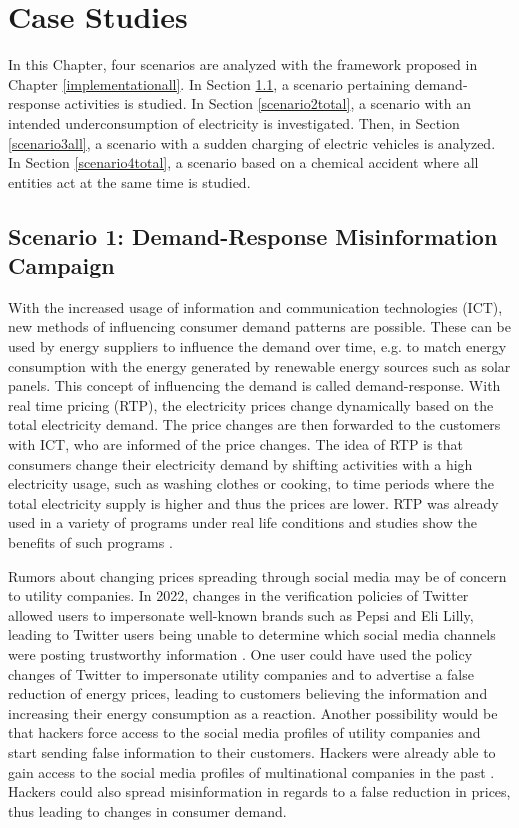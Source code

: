 \chapter{Case Studies}
\label{results}

In this Chapter, four scenarios are analyzed with the framework 
proposed in Chapter \ref{implementationall}.
In Section \ref{demandresponsesection}, a scenario
pertaining demand-response activities is studied.
In Section \ref{scenario2total}, a scenario
with an intended underconsumption of electricity is 
investigated. Then, in Section \ref{scenario3all},
a scenario with a sudden charging of electric vehicles
is analyzed.
In Section \ref{scenario4total}, a scenario 
based on a chemical accident where all entities act at 
the same time is studied.


\section{Scenario 1: Demand-Response Misinformation Campaign}
\label{demandresponsesection}

With the increased usage of information and communication 
technologies (ICT), new methods of influencing
consumer demand patterns are possible. 
These can be used by energy suppliers to influence the 
demand over time, e.g. to match energy consumption
with the energy generated by renewable energy sources such 
as solar panels. 
This concept of influencing the demand is called demand-response. 
With real time pricing (RTP), the electricity prices change
dynamically based on the total electricity demand.
The price changes are then forwarded to the customers with ICT, 
who are informed of the price changes.
The idea of RTP is that consumers change their electricity demand
by shifting activities with a high electricity usage, 
such as washing clothes or cooking, to time periods 
where the total electricity supply is higher and thus the prices
are lower.
RTP was already used in a variety of programs
under real life conditions \cite{barbose2004survey} 
and studies show the benefits of such programs \cite{albadi2008summary}.

Rumors about changing prices spreading through social media may be of 
concern to utility companies.
In 2022, changes in the verification policies of Twitter allowed users 
to impersonate well-known brands such as Pepsi and Eli Lilly, leading to Twitter 
users being unable to determine which social media channels were
posting trustworthy information \cite{twitterchaos}. One user could
have used the policy changes of Twitter to impersonate	utility companies
and to advertise a false reduction of energy prices, leading to customers
believing the information and increasing their energy consumption as a 
reaction. Another possibility would be that hackers force access to the
social media profiles of utility companies and start sending false 
information to their customers. Hackers were already able to gain access
to the social media profiles of multinational companies in the past
\cite{twitterhacker}. Hackers could also spread misinformation in regards
to a false reduction in prices, thus leading to changes in consumer demand.

